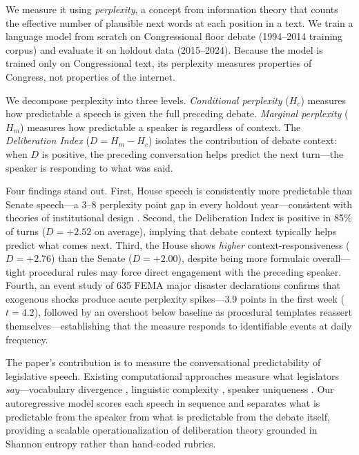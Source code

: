 \documentclass[12pt]{article}
\newcommand{\Hc}{H_c}
\newcommand{\Hm}{H_m}
\newcommand{\DI}{\mathit{D}}
\begin{document}
We measure it using \textit{perplexity}, a concept from information theory \citep{shannon1948} that counts the effective number of plausible next words at each position in a text. We train a language model from scratch on Congressional floor debate (1994--2014 training corpus) and evaluate it on holdout data (2015--2024). Because the model is trained only on Congressional text, its perplexity measures properties of Congress, not properties of the internet.

We decompose perplexity into three levels. \textit{Conditional perplexity} ($\Hc$) measures how predictable a speech is given the full preceding debate. \textit{Marginal perplexity} ($\Hm$) measures how predictable a speaker is regardless of context. The \textit{Deliberation Index} ($\DI = \Hm - \Hc$) isolates the contribution of debate context: when $\DI$ is positive, the preceding conversation helps predict the next turn---the speaker is responding to what was said.

Four findings stand out. First, House speech is consistently more predictable than Senate speech---a 3--8 perplexity point gap in every holdout year---consistent with theories of institutional design \citep{perssonTabellini2000}. Second, the Deliberation Index is positive in 85\% of turns ($\DI = +2.52$ on average), implying that debate context typically helps predict what comes next. Third, the House shows \textit{higher} context-responsiveness ($\DI = +2.76$) than the Senate ($\DI = +2.00$), despite being more formulaic overall---tight procedural rules may force direct engagement with the preceding speaker. Fourth, an event study of 635 FEMA major disaster declarations confirms that exogenous shocks produce acute perplexity spikes---3.9 points in the first week ($t = 4.2$), followed by an overshoot below baseline as procedural templates reassert themselves---establishing that the measure responds to identifiable events at daily frequency.

The paper's contribution is to measure the conversational predictability of legislative speech. Existing computational approaches measure what legislators \textit{say}---vocabulary divergence \citep{gentzkow2019}, linguistic complexity \citep{spirling2016}, speaker uniqueness \citep{zhou2024}. Our autoregressive model scores each speech in sequence and separates what is predictable from the speaker from what is predictable from the debate itself, providing a scalable operationalization of deliberation theory \citep{habermas1996, steiner2004} grounded in Shannon entropy rather than hand-coded rubrics.
\end{document}
